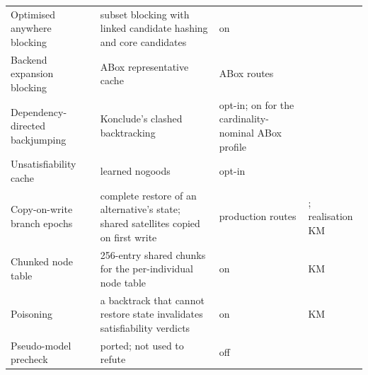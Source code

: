 \begin{small}
\begin{longtable}{@{}p{}p{}p{}p{}@{}}
Optimised anywhere blocking & subset blocking with linked candidate hashing and core candidates & on & \cite{steigmiller2016thesis,motik2009hypertableau}\\
Backend expansion blocking & ABox representative cache & ABox routes & \cite{steigmiller2021parallel}\\
Dependency-directed backjumping & Konclude's clashed backtracking & opt-in; on for the cardinality-nominal ABox profile & \cite{horrocks1999optimizing,steigmiller2012extended}\\
Unsatisfiability cache & learned nogoods & opt-in & \cite{steigmiller2012extended}\\
Copy-on-write branch epochs & complete restore of an alternative's state; shared satellites copied on first write & production routes & \cite{steigmiller2016thesis}; realisation KM\\
Chunked node table & 256-entry shared chunks for the per-individual node table & on & KM\\
Poisoning & a backtrack that cannot restore state invalidates satisfiability verdicts & on & KM\\
Pseudo-model precheck & ported; not used to refute & off & \cite{haarslev2001pseudo}\\
\bottomrule
\end{longtable}
\end{small}

